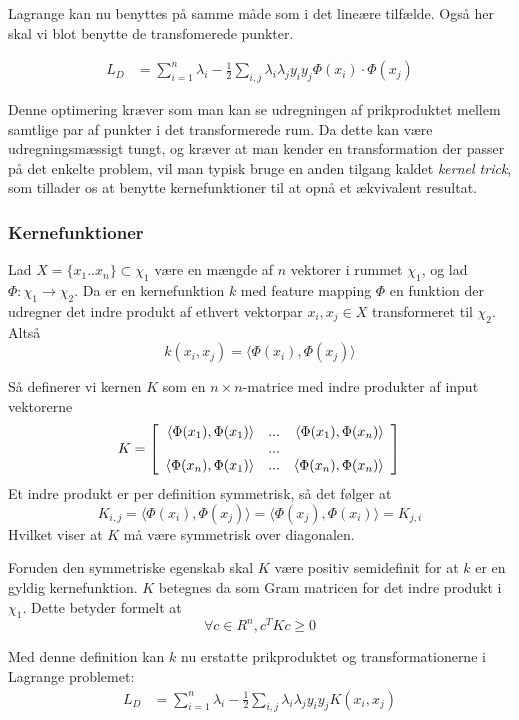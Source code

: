 \documentclass{article}
\begin{document}
Lagrange kan nu benyttes på samme måde som i det lineære tilfælde. Også her skal vi blot benytte de transfomerede punkter.

\begin{align*}
L_D&=\sum_{i=1}^{n}\lambda_i-\frac{1}{2}\sum_{i,j}\lambda_i\lambda_j y_iy_j\Phi(x_i)\cdot\Phi(x_j)
\end{align*}

Denne optimering kræver som man kan se udregningen af prikproduktet mellem samtlige par af punkter i det transformerede rum. Da dette kan være udregningsmæssigt tungt, og kræver at man kender en transformation der passer på det enkelte problem, vil man typisk bruge en anden tilgang kaldet \textit{kernel trick}, som tillader os at benytte kernefunktioner til at opnå et ækvivalent resultat.


\subsubsection{Kernefunktioner}
Lad $X=\{x_1..x_n\}\subset \chi_1$ være en mængde af $n$ vektorer i rummet $\chi_1$, og lad $\Phi:\chi_1\rightarrow\chi_2$. Da er en kernefunktion $k$ med feature mapping $\Phi$ en funktion der udregner det indre produkt af ethvert vektorpar $x_i,x_j\in X$ transformeret til $\chi_2$. Altså
\begin{equation}
k(x_i,x_j)=\langle\Phi(x_i),\Phi(x_j)\rangle
\end{equation}

Så definerer vi kernen $K$ som en $n\times n$-matrice med indre produkter af input vektorerne
\begin{equation}
K=\left[\begin{array}{r r r}
\langle\Phi(x_1),\Phi(x_1)\rangle & ... & \langle\Phi(x_1),\Phi(x_n)\rangle\\
 & ... & \\
\langle\Phi(x_n),\Phi(x_1)\rangle & ... & \langle\Phi(x_n),\Phi(x_n)\rangle\\
\end{array}\right]\\
\end{equation}
Et indre produkt er per definition symmetrisk, så det følger at
\begin{equation}
K_{i,j}=\langle\Phi(x_i),\Phi(x_j)\rangle=\langle\Phi(x_j),\Phi(x_i)\rangle=K_{j,i}
\end{equation}
Hvilket viser at $K$ må være symmetrisk over diagonalen. 

Foruden den symmetriske egenskab skal $K$ være positiv semidefinit for at $k$ er en gyldig kernefunktion. $K$ betegnes da som Gram matricen for det indre produkt i $\chi_1$. Dette betyder formelt at
\begin{equation}
\forall c\in R^n,c^TKc\geq 0
\end{equation}




Med denne definition kan $k$ nu erstatte prikproduktet og transformationerne i Lagrange problemet:
\begin{align*}
L_D&=\sum_{i=1}^{n}\lambda_i-\frac{1}{2}\sum_{i,j}\lambda_i\lambda_j y_iy_jK(x_i,x_j)
\end{align*}
\end{document}
